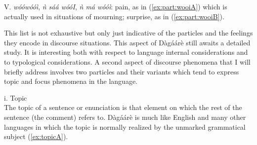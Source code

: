 \noindent V. \textit{wóówóóì}, \textit{ǹ sáá wóóI}, \textit{ǹ má wóóì}: pain, as in (\ref{ex:part:wooiA}) which is actually used in situations
of mourning; surprise, as in (\ref{ex:part:wooiB}).


\ea {}
\z\z 

This list is not exhaustive but only just indicative of the particles and the feelings they encode
in discourse situations. This aspect of Dàgáárè still awaits a detailed study. It is interesting
both with respect to language internal considerations and to typological considerations.
A second aspect of discourse phenomena that I will briefly address involves two
particles and their variants which tend to express topic and focus phenomena in the language.\bigskip

\noindent i. Topic\\ 

The topic of a sentence or enunciation is that element on which the rest of the sentence
(the comment) refers to. Dàgáárè is much like English and many other languages in which
the topic is normally realized by the unmarked grammatical subject (\ref{ex:topicA}).

\ea {}
\z\z


\ea {}
\z\z 

